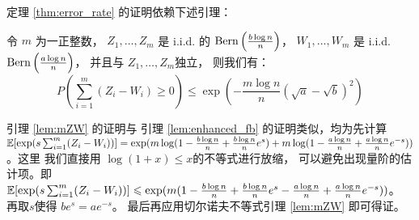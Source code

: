 定理 \ref{thm:error_rate} 的证明依赖下述引理：
\begin{lemma}\label{lem:mZW}
	令 $m$ 为一正整数，
	$Z_1, \dots, Z_m$
  是 i.i.d. 的 $\operatorname{Bern}\left(\frac{b \log n}{n}\right)$，
  $W_1, \dots, W_m$ 是 i.i.d. $\operatorname{Bern}\left(\frac{a \log n}{n}\right)$，
  并且与 $Z_1, \dots, Z_m$独立，
	则我们有：
\begin{equation}
	P(\sum_{i=1}^m (Z_i  - W_i) \geq 0) \leq \exp(-\frac{m \log n}{n}(\sqrt{a} - \sqrt{b})^2)
	\end{equation}
\end{lemma}
引理 \ref{lem:mZW} 的证明与
引理 \ref{lem:enhanced_fb} 的证明类似，均为先计算
$\operatorname{\mathbb{E}}[\exp(s \sum_{i=1}^m (Z_i - W_i))]
=\exp(m \log(1-\frac{b \log n}{n} + \frac{b \log n}{n} e^s) + m \log(1-\frac{a \log n}{n} + \frac{a \log n}{n} e^{-s}))$。这里
我们直接用 $\log(1+x)\leq x$的不等式进行放缩，
可以避免出现量阶的估计项。即
$\operatorname{\mathbb{E}}[\exp(s \sum_{i=1}^m (Z_i - W_i))]
\leqslant \exp(m(1-\frac{b \log n}{n} + \frac{b \log n}{n} e^s - \frac{a \log n}{n} + \frac{a \log n}{n} e^{-s}))$。
再取$s$使得 $be^s=ae^{-s}$。
最后再应用切尔诺夫不等式引理 \ref{lem:mZW} 即可得证。

